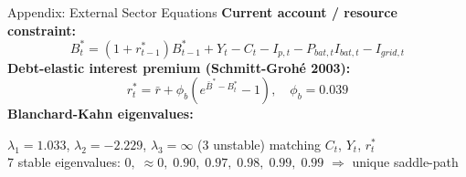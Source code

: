\documentclass[aspectratio=169,10pt]{beamer}
\begin{document}
\begin{frame}{Appendix: External Sector Equations}
  \textbf{Current account / resource constraint:}
  \[
    B^*_t = (1+r^*_{t-1})B^*_{t-1} + Y_t - C_t - I_{p,t} - P_{bat,t}I_{bat,t} - I_{grid,t}
  \]
  \textbf{Debt-elastic interest premium (Schmitt-Grohé 2003):}
  \[
    r^*_t = \bar{r} + \phi_b\!\left(e^{\bar{B}^*-B^*_t}-1\right), \quad \phi_b=0.039
  \]
  \textbf{Blanchard-Kahn eigenvalues:}
  \begin{keybox}
    \small $\lambda_1=1.033$, $\lambda_2=-2.229$, $\lambda_3=\infty$ (3 unstable) matching $C_t$, $Y_t$, $r^*_t$\\
    7 stable eigenvalues: $0,\;\approx0,\;0.90,\;0.97,\;0.98,\;0.99,\;0.99$ $\Rightarrow$ unique saddle-path \checkmark
  \end{keybox}
\end{frame}
\end{document}
